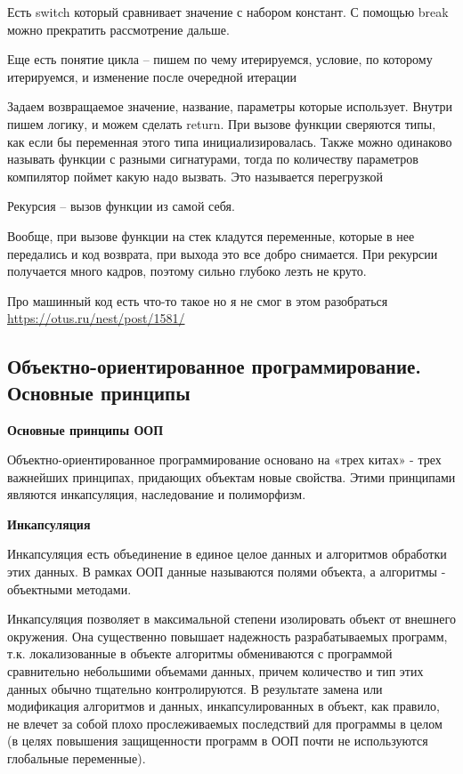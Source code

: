 \documentclass{article}
\begin{document}
Есть switch который сравнивает значение с набором констант. С помощью break можно прекратить рассмотрение дальше.

Еще есть понятие цикла -- пишем по чему итерируемся, условие, по которому итерируемся, и изменение после очередной итерации


Задаем возвращаемое значение, название, параметры которые использует. Внутри пишем логику, и можем сделать return. При вызове функции сверяются типы, как если бы переменная этого типа инициализировалась. Также можно одинаково называть функции с разными сигнатурами, тогда по количеству параметров компилятор поймет какую надо вызвать. Это называется перегрузкой

Рекурсия -- вызов функции из самой себя.

Вообще, при вызове функции на стек кладутся переменные, которые в нее передались и код возврата, при выхода это все добро снимается. При рекурсии получается много кадров, поэтому сильно глубоко лезть не круто.

Про машинный код есть что-то такое но я не смог в этом разобраться \href{https://otus.ru/nest/post/1581/}{https://otus.ru/nest/post/1581/}

\subsection{Объектно-ориентированное программирование. Основные принципы}

{\bf Основные принципы ООП}

Объектно-ориентированное программирование основано на «трех китах» - трех важнейших принципах, придающих объектам новые свойства. Этими принципами являются инкапсуляция, наследование и полиморфизм.

{\bf Инкапсуляция}

Инкапсуляция есть объединение в единое целое данных и алгоритмов обработки этих данных. В рамках ООП данные называются полями объекта, а алгоритмы - объектными методами.

Инкапсуляция позволяет в максимальной степени изолировать объект от внешнего окружения. Она существенно повышает надежность разрабатываемых программ, т.к. локализованные в объекте алгоритмы обмениваются с программой сравнительно небольшими объемами данных, причем количество и тип этих данных обычно тщательно контролируются. В результате замена или модификация алгоритмов и данных, инкапсулированных в объект, как правило, не влечет за собой плохо прослеживаемых последствий для программы в целом (в целях повышения защищенности программ в ООП почти не используются глобальные переменные).
\end{document}
